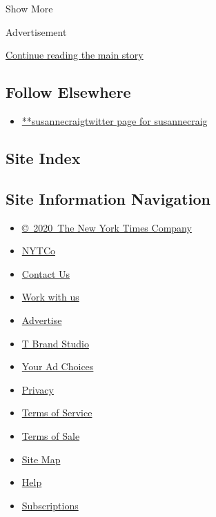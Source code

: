 Show More

Advertisement

\protect\hyperlink{after-mid2}{Continue reading the main story}

\hypertarget{follow-elsewhere}{%
\subsection{Follow Elsewhere}\label{follow-elsewhere}}

\begin{itemize}
\tightlist
\item
  \href{https://twitter.com/susannecraig}{**susannecraigtwitter page for
  susannecraig}
\end{itemize}

\hypertarget{site-index}{%
\subsection{Site Index}\label{site-index}}

\hypertarget{site-information-navigation}{%
\subsection{Site Information
Navigation}\label{site-information-navigation}}

\begin{itemize}
\tightlist
\item
  \href{https://help.nytimes.com/hc/en-us/articles/115014792127-Copyright-notice}{©~2020~The
  New York Times Company}
\end{itemize}

\begin{itemize}
\tightlist
\item
  \href{https://www.nytco.com/}{NYTCo}
\item
  \href{https://help.nytimes.com/hc/en-us/articles/115015385887-Contact-Us}{Contact
  Us}
\item
  \href{https://www.nytco.com/careers/}{Work with us}
\item
  \href{https://nytmediakit.com/}{Advertise}
\item
  \href{http://www.tbrandstudio.com/}{T Brand Studio}
\item
  \href{https://www.nytimes.com/privacy/cookie-policy\#how-do-i-manage-trackers}{Your
  Ad Choices}
\item
  \href{https://www.nytimes.com/privacy}{Privacy}
\item
  \href{https://help.nytimes.com/hc/en-us/articles/115014893428-Terms-of-service}{Terms
  of Service}
\item
  \href{https://help.nytimes.com/hc/en-us/articles/115014893968-Terms-of-sale}{Terms
  of Sale}
\item
  \href{https://spiderbites.nytimes.com}{Site Map}
\item
  \href{https://help.nytimes.com/hc/en-us}{Help}
\item
  \href{https://www.nytimes.com/subscription?campaignId=37WXW}{Subscriptions}
\end{itemize}
